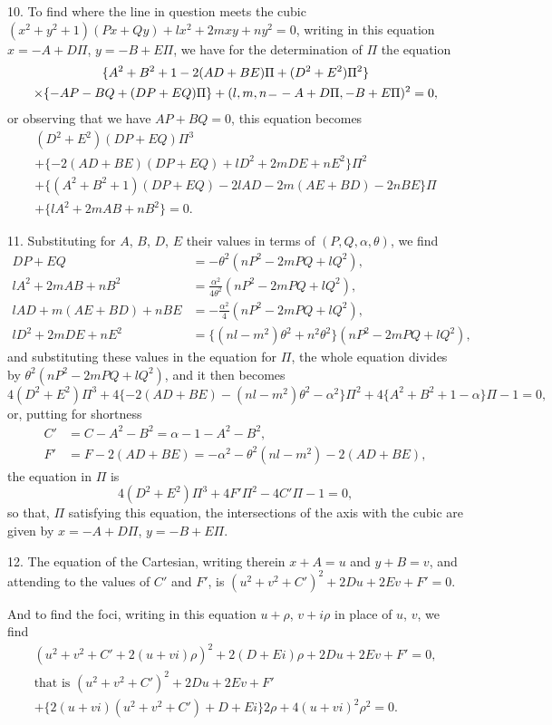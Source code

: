 \documentclass[11pt,a4paper]{article}
\theoremstyle{plain}
\theoremstyle{definition}
\theoremstyle{remark}
\begin{document}
10. To find where the line in question meets the cubic $(x^{2}+y^{2}+1)(Px+Qy)+lx^{2}+2mxy+ny^{2}=0$, writing in this equation $x=-A+D\Pi$, $y=-B+E\Pi$, we have for the determination of $\Pi$ the equation
\begin{multline*}
\{A^{2}+B^{2}+1-2(AD+BE)\Pi+(D^{2}+E^{2})\Pi^{2}\}\\
\times\{-AP-BQ+(DP+EQ)\Pi\}+(l,m,n\,\overline{\vrule width 6pt}\,-A+D\Pi,-B+E\Pi)^{2}=0,
\end{multline*}
or observing that we have $AP+BQ=0$, this equation becomes
\begin{multline*}
(D^{2}+E^{2})(DP+EQ)\Pi^{3}\\
+\{-2(AD+BE)(DP+EQ)+lD^{2}+2mDE+nE^{2}\}\Pi^{2}\\
+\{(A^{2}+B^{2}+1)(DP+EQ)-2lAD-2m(AE+BD)-2nBE\}\Pi\\
+\{lA^{2}+2mAB+nB^{2}\}=0.
\end{multline*}

11. Substituting for $A$, $B$, $D$, $E$ their values in terms of $(P,Q,\alpha,\theta)$, we find
\begin{align*}
DP+EQ &= -\theta^{2}(nP^{2}-2mPQ+lQ^{2}),\\
lA^{2}+2mAB+nB^{2} &= \frac{\alpha^{2}}{4\theta^{2}}(nP^{2}-2mPQ+lQ^{2}),\\
lAD+m(AE+BD)+nBE &= -\frac{\alpha^{2}}{4}(nP^{2}-2mPQ+lQ^{2}),\\
lD^{2}+2mDE+nE^{2} &= \{(nl-m^{2})\theta^{2}+n^{2}\theta^{2}\}(nP^{2}-2mPQ+lQ^{2}),
\end{align*}
and substituting these values in the equation for $\Pi$, the whole equation divides by $\theta^{2}(nP^{2}-2mPQ+lQ^{2})$, and it then becomes
\[
4(D^{2}+E^{2})\Pi^{3}+4\{-2(AD+BE)-(nl-m^{2})\theta^{2}-\alpha^{2}\}\Pi^{2}+4\{A^{2}+B^{2}+1-\alpha\}\Pi-1=0,
\]
or, putting for shortness
\begin{align*}
C' &= C-A^{2}-B^{2}=\alpha-1-A^{2}-B^{2},\\
F' &= F-2(AD+BE)=-\alpha^{2}-\theta^{2}(nl-m^{2})-2(AD+BE),
\end{align*}
the equation in $\Pi$ is
\[
4(D^{2}+E^{2})\Pi^{3}+4F'\Pi^{2}-4C'\Pi-1=0,
\]
so that, $\Pi$ satisfying this equation, the intersections of the axis with the cubic are given by $x=-A+D\Pi$, $y=-B+E\Pi$.

12. The equation of the Cartesian, writing therein $x+A=u$ and $y+B=v$, and attending to the values of $C'$ and $F'$, is $(u^{2}+v^{2}+C')^{2}+2Du+2Ev+F'=0$.

And to find the foci, writing in this equation $u+\rho$, $v+i\rho$ in place of $u$, $v$, we find
\begin{multline*}
(u^{2}+v^{2}+C'+2(u+vi)\rho)^{2}+2(D+Ei)\rho+2Du+2Ev+F'=0,\\
\text{that is }(u^{2}+v^{2}+C')^{2}+2Du+2Ev+F'\\
+\{2(u+vi)(u^{2}+v^{2}+C')+D+Ei\}2\rho+4(u+vi)^{2}\rho^{2}=0.
\end{multline*}
\end{document}

